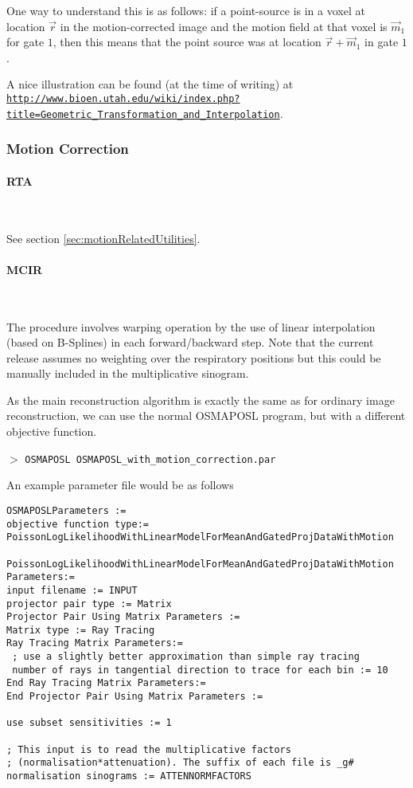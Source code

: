 \documentclass{article}
\def\url#1#2{\mbox{\href{#1}{\tt #2}}}
\newcommand{\subsubsubsection}[1]{\paragraph{#1}\mbox{} \\}
\newcommand{\cmdline}[1]{\par \noindent $>$ \texttt{#1}\par}
\begin{document}
{{{One way to understand this is as follows: if a point-source is in a voxel at location $\vec r$ in the motion-corrected image
and the motion field at that voxel is $\vec m_1$ for gate $1$, then this means that the point source
was at location $\vec r + \vec m_1$ in gate $1$.

A nice illustration can be found (at the time of writing) at\\ 
{ \small
\url{http://www.bioen.utah.edu/wiki/index.php?title=Geometric_Transformation_and_Interpolation}{http://www.bioen.utah.edu/wiki/index.php?title=Geometric\_Transformation\_and\_Interpolation}}.

\subsubsection{Motion Correction}

{ \subsubsubsection{RTA}
}
See section \ref{sec:motionRelatedUtilities}.

{ \subsubsubsection{MCIR}
}

The procedure involves warping operation by the use of linear interpolation (based
on B-Splines) in each forward/backward step. Note that the current release
assumes no weighting over the respiratory positions but this could be manually
included in the multiplicative sinogram.

As the main reconstruction algorithm is exactly the same as for ordinary image
reconstruction, we can use the normal OSMAPOSL program, but with a different
objective function. 

\cmdline{OSMAPOSL OSMAPOSL\_with\_motion\_correction.par}

An example parameter file would be as follows
{
\small
\begin{verbatim}
OSMAPOSLParameters :=
objective function type:= PoissonLogLikelihoodWithLinearModelForMeanAndGatedProjDataWithMotion

PoissonLogLikelihoodWithLinearModelForMeanAndGatedProjDataWithMotion Parameters:=
input filename := INPUT
projector pair type := Matrix
Projector Pair Using Matrix Parameters :=
Matrix type := Ray Tracing
Ray Tracing Matrix Parameters:=
 ; use a slightly better approximation than simple ray tracing
 number of rays in tangential direction to trace for each bin := 10
End Ray Tracing Matrix Parameters:=
End Projector Pair Using Matrix Parameters :=

use subset sensitivities := 1

; This input is to read the multiplicative factors
; (normalisation*attenuation). The suffix of each file is _g#
normalisation sinograms := ATTENNORMFACTORS


\end{verbatim}}}}}
\end{document}

